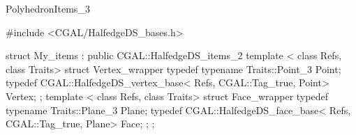 \begin{ccRefConcept}{PolyhedronItems_3}
\begin{ccExampleCode}
#include <CGAL/HalfedgeDS_bases.h>

struct My_items : public CGAL::HalfedgeDS_items_2 {
    template < class Refs, class Traits>
    struct Vertex_wrapper {
        typedef typename Traits::Point_3 Point;
        typedef CGAL::HalfedgeDS_vertex_base< Refs, CGAL::Tag_true, Point> Vertex;
    };
    template < class Refs, class Traits>
    struct Face_wrapper {
        typedef typename Traits::Plane_3 Plane;
        typedef CGAL::HalfedgeDS_face_base< Refs, CGAL::Tag_true, Plane>   Face;
    };
};
\end{ccExampleCode}

\end{ccRefConcept}

\ccRefPageEnd

